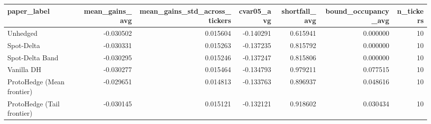 \begin{tabular}{lrrrrrr}
\toprule
paper_label & mean_gains_avg & mean_gains_std_across_tickers & cvar05_avg & shortfall_avg & bound_occupancy_avg & n_tickers \\
\midrule
Unhedged & -0.030502 & 0.015604 & -0.140291 & 0.615941 & 0.000000 & 10 \\
Spot-Delta & -0.030331 & 0.015263 & -0.137235 & 0.815792 & 0.000000 & 10 \\
Spot-Delta Band & -0.030295 & 0.015246 & -0.137247 & 0.815806 & 0.000000 & 10 \\
Vanilla DH & -0.030277 & 0.015464 & -0.134793 & 0.979211 & 0.077515 & 10 \\
ProtoHedge (Mean frontier) & -0.029651 & 0.014813 & -0.133763 & 0.896937 & 0.048616 & 10 \\
ProtoHedge (Tail frontier) & -0.030145 & 0.015121 & -0.132121 & 0.918602 & 0.030434 & 10 \\
\bottomrule
\end{tabular}
